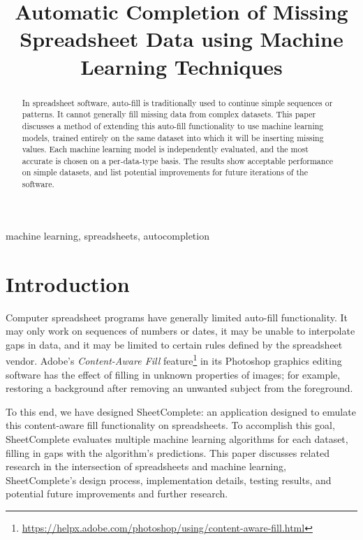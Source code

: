 \documentclass[conference]{IEEEtran}
\begin{document}
\title{Automatic Completion of Missing Spreadsheet Data using Machine Learning Techniques}

\author{
}

\maketitle

\begin{abstract}
In spreadsheet software, auto-fill is traditionally used to continue simple sequences or patterns. It cannot generally fill missing data from complex datasets. This paper discusses a method of extending this auto-fill functionality to use machine learning models, trained entirely on the same dataset into which it will be inserting missing values. Each machine learning model is independently evaluated, and the most accurate is chosen on a per-data-type basis. The results show acceptable performance on simple datasets, and list potential improvements for future iterations of the software.
\end{abstract}

\begin{IEEEkeywords}
machine learning, spreadsheets, autocompletion
\end{IEEEkeywords}

\section{Introduction}
Computer spreadsheet programs have generally limited auto-fill functionality. It may only work on sequences of numbers or dates, it may be unable to interpolate gaps in data, and it may be limited to certain rules defined by the spreadsheet vendor. Adobe's \textit{Content-Aware Fill} feature\footnote{\url{https://helpx.adobe.com/photoshop/using/content-aware-fill.html}} in its Photoshop graphics editing software has the effect of filling in unknown properties of images; for example, restoring a background after removing an unwanted subject from the foreground.

To this end, we have designed SheetComplete: an application designed to emulate this content-aware fill functionality on spreadsheets. To accomplish this goal, SheetComplete evaluates multiple machine learning algorithms for each dataset, filling in gaps with the algorithm's predictions. This paper discusses related research in the intersection of spreadsheets and machine learning, SheetComplete's design process, implementation details, testing results, and potential future improvements and further research.
\end{document}
